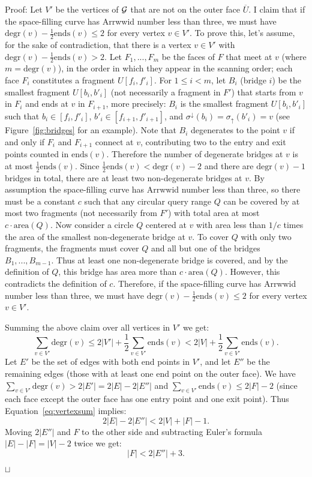 \documentclass[11pt,a4paper]{article}
\newcommand{\area}{\mathrm{area}}
\newcommand{\unittile}{\ensuremath{U}\xspace}
\newcommand{\degr}{\mathrm{degr}}
\newcommand{\doors}{\mathrm{ends}}
\newenvironment{proof}{Proof:}{\qed}
\def\squareforqed{\hbox{\rlap{$\sqcap$}$\sqcup$}}
\def\qed{\ifmmode\squareforqed\else{\unskip\nobreak\hfil
\penalty50\hskip1em\null\nobreak\hfil\squareforqed
\parfillskip=0pt\finalhyphendemerits=0\endgraf}\fi}
\begin{document}
\begin{proof}
Let $V'$ be the vertices of ${\cal G}$ that are not on the outer face $\overline{\unittile}$. I claim that if the space-filling curve has Arrwwid number less than three, we must have $\degr(v) - \frac12 \doors(v) \leq 2$ for every vertex $v \in V'$. To prove this, let's assume, for the sake of contradiction, that there is a vertex $v \in V'$ with $\degr(v) - \frac 12 \doors(v) > 2$. Let $F_1, ..., F_m$ be the faces of $F$ that meet at $v$ (where $m = \degr(v)$), in the order in which they appear in the scanning order; each face $F_i$ constitutes a fragment $U[f_i,f'_i]$. For $1 \leq i < m$, let $B_i$ (bridge $i$) be the smallest fragment $U[b_i,b'_i]$ (not necessarily a fragment in $F'$) that starts from $v$ in $F_i$ and ends at $v$ in $F_{i+1}$, more precisely: $B_i$ is the smallest fragment $U[b_i,b'_i]$ such that $b_i \in [f_i,f'_i]$, $b'_i \in [f_{i+1},f'_{i+1}]$, and $\sigma^{\downarrow}(b_i) = \sigma_{\uparrow}(b'_i) = v$ (see Figure~\ref{fig:bridges} for an example). Note that $B_i$ degenerates to the point $v$ if and only if $F_i$ and $F_{i+1}$ connect at $v$, contributing two to the entry and exit points counted in $\doors(v)$. Therefore the number of degenerate bridges at $v$ is at most $\frac12 \doors(v)$. Since $\frac 12 \doors(v) < \degr(v) - 2$ and there are $\degr(v)-1$ bridges in total, there are at least two non-degenerate bridges at $v$. By assumption the space-filling curve has Arrwwid number less than three, so there must be a constant $c$ such that any circular query range $Q$ can be covered by at most two fragments (not necessarily from $F'$) with total area at most $c \cdot \area(Q)$. Now consider a circle $Q$ centered at $v$ with area less than $1/c$ times the area of the smallest non-degenerate bridge at $v$. To cover $Q$ with only two fragments, the fragments must cover $Q$ and all but one of the bridges $B_1, ..., B_{m-1}$. Thus at least one non-degenerate bridge is covered, and by the definition of $Q$, this bridge has area more than $c \cdot \area(Q)$. However, this contradicts the definition of $c$. Therefore, if the space-filling curve has Arrwwid number less than three, we must have $\degr(v) - \frac12 \doors(v) \leq 2$ for every vertex $v \in V'$.

Summing the above claim over all vertices in $V'$ we get:\begin{equation}\label{eq:vertexsum}
\sum_{v \in V'} \degr(v) \leq 2|V'| + \frac12 \sum_{v \in V'} \doors(v) < 2|V| + \frac12 \sum_{v \in V'} \doors(v).
\end{equation}
Let $E'$ be the set of edges with both end points in $V'$, and let $E''$ be the remaining edges (those with at least one end point on the outer face). We have $\sum_{v \in V'} \degr(v) > 2|E'| = 2|E| - 2|E''|$ and $\sum_{v \in V'} \doors(v) \leq 2|F| - 2$ (since each face except the outer face has one entry point and one exit point). Thus Equation~\ref{eq:vertexsum} implies:\[
2|E| - 2|E''| < 2|V| + |F| - 1.
\]
Moving $2|E''|$ and $F$ to the other side and subtracting Euler's formula $|E| - |F| = |V| - 2$ twice we get:\begin{equation}\label{eq:maxfaces}
|F| < 2|E''| + 3.
\end{equation}


\end{proof}
\end{document}
